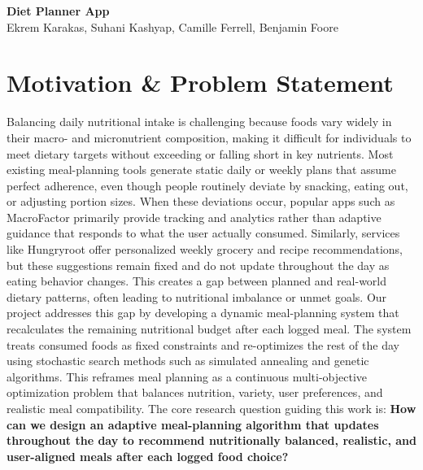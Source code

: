 \documentclass[11pt, letterpaper]{article}
\begin{document}
\begin{center}
  {\Large\bfseries\color{headcolor} Diet Planner App}\\[4pt]
  {\normalsize Ekrem Karakas, Suhani Kashyap, Camille Ferrell, Benjamin Foore}\\[2pt]
\end{center}

\vspace{4pt}

\section{Motivation \& Problem Statement}
\begin{tcolorbox}[sectionbox, height=4.6cm, valign=top]
  Balancing daily nutritional intake is challenging because foods vary widely in their macro- and micronutrient composition, 
  making it difficult for individuals to meet dietary targets without exceeding or falling short in key nutrients. Most existing 
  meal-planning tools generate static daily or weekly plans that assume perfect adherence, even though people routinely deviate by 
  snacking, eating out, or adjusting portion sizes. When these deviations occur, popular apps such as MacroFactor primarily provide 
  tracking and analytics rather than adaptive guidance that responds to what the user actually consumed. Similarly, services like 
  Hungryroot offer personalized weekly grocery and recipe recommendations, but these suggestions remain fixed and do not update throughout 
  the day as eating behavior changes. This creates a gap between planned and real-world dietary patterns, often leading to nutritional 
  imbalance or unmet goals. Our project addresses this gap by developing a dynamic meal-planning system that recalculates the remaining 
  nutritional budget after each logged meal. The system treats consumed foods as fixed constraints and re-optimizes the rest of the day 
  using stochastic search methods such as simulated annealing and genetic algorithms. This reframes meal planning as a continuous multi-objective 
  optimization problem that balances nutrition, variety, user preferences, and realistic meal compatibility. The core research question 
  guiding this work is: \textbf{How can we design an adaptive meal-planning algorithm that updates throughout the day to recommend 
  nutritionally balanced, realistic, and user-aligned meals after each logged food choice?}
\end{tcolorbox}
\end{document}
